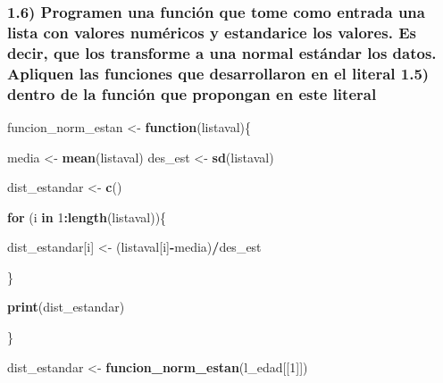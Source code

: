 \documentclass[
]{article}
\newenvironment{Shaded}{\begin{snugshade}}{\end{snugshade}}
\newcommand{\ControlFlowTok}[1]{\textcolor[rgb]{0.13,0.29,0.53}{\textbf{#1}}}
\newcommand{\DecValTok}[1]{\textcolor[rgb]{0.00,0.00,0.81}{#1}}
\newcommand{\FunctionTok}[1]{\textcolor[rgb]{0.13,0.29,0.53}{\textbf{#1}}}
\newcommand{\NormalTok}[1]{#1}
\newcommand{\OtherTok}[1]{\textcolor[rgb]{0.56,0.35,0.01}{#1}}
\newcommand{\SpecialCharTok}[1]{\textcolor[rgb]{0.81,0.36,0.00}{\textbf{#1}}}
\begin{document}
\hypertarget{programen-una-funciuxf3n-que-tome-como-entrada-una-lista-con-valores-numuxe9ricos-y-estandarice-los-valores.-es-decir-que-los-transforme-a-una-normal-estuxe1ndar-los-datos.-apliquen-las-funciones-que-desarrollaron-en-el-literal-1.5-dentro-de-la-funciuxf3n-que-propongan-en-este-literal}{%
\subsubsection{1.6) Programen una función que tome como entrada una
lista con valores numéricos y estandarice los valores. Es decir, que los
transforme a una normal estándar los datos. Apliquen las funciones que
desarrollaron en el literal 1.5) dentro de la función que propongan en
este
literal}\label{programen-una-funciuxf3n-que-tome-como-entrada-una-lista-con-valores-numuxe9ricos-y-estandarice-los-valores.-es-decir-que-los-transforme-a-una-normal-estuxe1ndar-los-datos.-apliquen-las-funciones-que-desarrollaron-en-el-literal-1.5-dentro-de-la-funciuxf3n-que-propongan-en-este-literal}}

\begin{Shaded}
\begin{Highlighting}[]
\NormalTok{  funcion\_norm\_estan }\OtherTok{\textless{}{-}} \ControlFlowTok{function}\NormalTok{(listaval)\{}
    
\NormalTok{    media }\OtherTok{\textless{}{-}} \FunctionTok{mean}\NormalTok{(listaval)}
\NormalTok{    des\_est }\OtherTok{\textless{}{-}} \FunctionTok{sd}\NormalTok{(listaval)}

\NormalTok{    dist\_estandar }\OtherTok{\textless{}{-}} \FunctionTok{c}\NormalTok{()}
    
    \ControlFlowTok{for}\NormalTok{ (i }\ControlFlowTok{in} \DecValTok{1}\SpecialCharTok{:}\FunctionTok{length}\NormalTok{(listaval))\{}
    
\NormalTok{    dist\_estandar[i] }\OtherTok{\textless{}{-}}\NormalTok{ (listaval[i]}\SpecialCharTok{{-}}\NormalTok{media)}\SpecialCharTok{/}\NormalTok{des\_est}
    
\NormalTok{    \}}
    
    \FunctionTok{print}\NormalTok{(dist\_estandar)}
   
\NormalTok{  \}}

\NormalTok{dist\_estandar }\OtherTok{\textless{}{-}} \FunctionTok{funcion\_norm\_estan}\NormalTok{(l\_edad[[}\DecValTok{1}\NormalTok{]])}
\end{Highlighting}
\end{Shaded}
\end{document}
